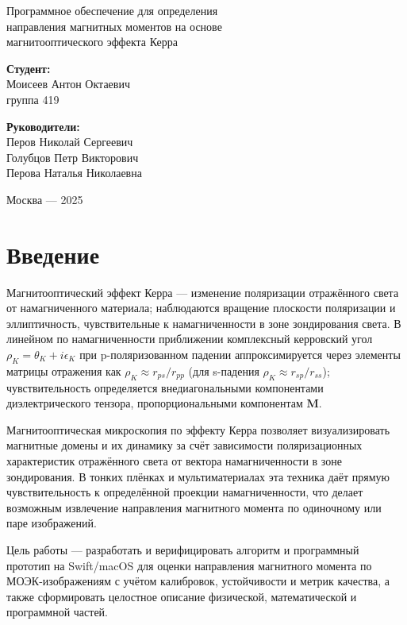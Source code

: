 \documentclass[12pt,a4paper]{article}
\numberwithin{equation}{section}
\begin{document}
\begin{titlepage}
\centering
{\Large Программное обеспечение для определения\\[2pt]
направления магнитных моментов на основе\\[2pt]
магнитооптического эффекта Керра\par}
\vspace{16mm}
\begin{flushleft}
\textbf{Студент:}\\
Моисеев Антон Октаевич\\
группа 419

\vspace{6mm}
\textbf{Руководители:}\\
Перов Николай Сергеевич\\
Голубцов Петр Викторович\\
Перова Наталья Николаевна
\end{flushleft}
\vfill
Москва — 2025
\end{titlepage}

\tableofcontents
\newpage

\section{Введение}

Магнитооптический эффект Керра — изменение поляризации отражённого света от намагниченного материала; наблюдаются вращение плоскости поляризации и эллиптичность, чувствительные к намагниченности в зоне зондирования света. В линейном по намагниченности приближении комплексный керровский угол \(\rho_K=\theta_K+i\epsilon_K\) при p-поляризованном падении аппроксимируется через элементы матрицы отражения как \(\rho_K\approx r_{ps}/r_{pp}\) (для s-падения \(\rho_K\approx r_{sp}/r_{ss}\)); чувствительность определяется внедиагональными компонентами диэлектрического тензора, пропорциональными компонентам \(\mathbf M\).


Магнитооптическая микроскопия по эффекту Керра позволяет визуализировать магнитные домены и их динамику за счёт зависимости поляризационных характеристик отражённого света от вектора намагниченности в зоне зондирования. В тонких плёнках и мультиматериалах эта техника даёт прямую чувствительность к определённой проекции намагниченности, что делает возможным извлечение направления магнитного момента по одиночному или паре изображений. 

Цель работы — разработать и верифицировать алгоритм и программный прототип на Swift/macOS для оценки направления магнитного момента по МОЭК-изображениям с учётом калибровок, устойчивости и метрик качества, а также сформировать целостное описание физической, математической и программной частей.
\end{document}
